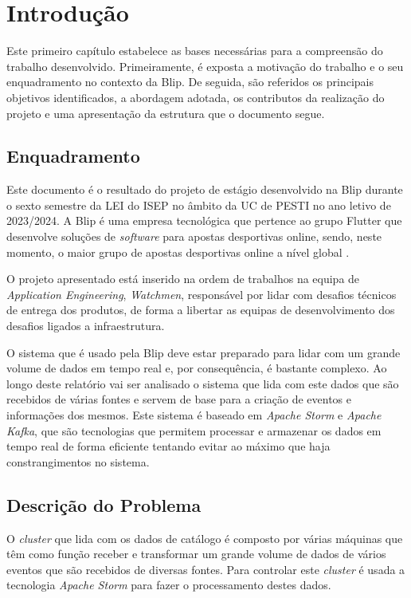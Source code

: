 \chapter{Introdução} 	
\label{sec:1-Introducao}

Este primeiro capítulo estabelece as bases necessárias para a compreensão do trabalho desenvolvido. 
Primeiramente, é exposta a motivação do trabalho e o seu enquadramento no contexto da Blip. 
De seguida, são referidos os principais objetivos identificados, a abordagem adotada, os contributos 
da realização do projeto e uma apresentação da estrutura que o documento segue.

\section{Enquadramento}

Este documento é o resultado do projeto de estágio desenvolvido na Blip durante o sexto semestre 
da \ac{LEI} do \ac{ISEP} no âmbito da \ac{UC} de \ac{PESTI} no ano letivo de 2023/2024. A Blip é 
uma empresa tecnológica que pertence ao grupo Flutter que desenvolve soluções de \textit{software} 
para apostas desportivas online, sendo, neste momento, o maior grupo de apostas desportivas online 
a nível global \cite{blip}.

O projeto apresentado está inserido na ordem de trabalhos na equipa de \textit{Application Engineering},
\textit{Watchmen}, responsável por lidar com desafios técnicos de entrega dos produtos, de forma
a libertar as equipas de desenvolvimento dos desafios ligados a infraestrutura.

O sistema que é usado pela Blip deve estar preparado para lidar com um grande volume de dados em 
tempo real e, por consequência, é bastante complexo. Ao longo deste relatório vai ser analisado 
o sistema que lida com este dados que são recebidos de várias fontes e servem de base para a criação 
de eventos e informações dos mesmos. Este sistema é baseado em \textit{Apache Storm} e 
\textit{Apache Kafka}, que são tecnologias que permitem processar e armazenar os dados em tempo 
real de forma eficiente tentando evitar ao máximo que haja constrangimentos no sistema.

\section{Descrição do Problema}

O \textit{\gls{cluster}} que lida com os dados de catálogo é composto por várias máquinas que têm
como função receber e transformar um grande volume de dados de vários eventos que são recebidos de 
diversas fontes. Para controlar este \textit{\gls{cluster}} é usada a tecnologia \textit{Apache Storm}
para fazer o processamento destes dados.

